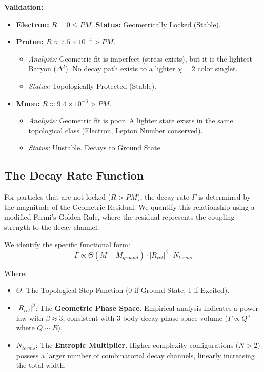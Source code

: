 \textbf{Validation:}
\begin{itemize}
    \item \textbf{Electron:} $R=0 \le PM$. \textbf{Status:} Geometrically Locked (Stable).
    \item \textbf{Proton:} $R \approx 7.5 \times 10^{-4} > PM$.
    \begin{itemize}
        \item \textit{Analysis:} Geometric fit is imperfect (stress exists), but it is the lightest Baryon ($\Delta^2$). No decay path exists to a lighter $\chi=2$ color singlet.
        \item \textit{Status:} Topologically Protected (Stable).
    \end{itemize}
    \item \textbf{Muon:} $R \approx 9.4 \times 10^{-3} > PM$.
    \begin{itemize}
        \item \textit{Analysis:} Geometric fit is poor. A lighter state exists in the same topological class (Electron, Lepton Number conserved).
        \item \textit{Status:} Unstable. Decays to Ground State.
    \end{itemize}
\end{itemize}

\subsection*{The Decay Rate Function}

For particles that are not locked ($R > PM$), the decay rate $\Gamma$ is determined by the magnitude of the Geometric Residual. We quantify this relationship using a modified Fermi's Golden Rule, where the residual represents the coupling strength to the decay channel.

We identify the specific functional form:
\[ \Gamma \propto \Theta(M - M_{ground}) \cdot |R_{rel}|^\beta \cdot N_{terms} \]

Where:
\begin{itemize}
    \item $\Theta$: The Topological Step Function (0 if Ground State, 1 if Excited).
    \item $|R_{rel}|^\beta$: The \textbf{Geometric Phase Space}. Empirical analysis indicates a power law with \textbf{$\beta \approx 3$}, consistent with 3-body decay phase space volume ($\Gamma \propto Q^5$ where $Q \sim R$).
    \item $N_{terms}$: The \textbf{Entropic Multiplier}. Higher complexity configurations ($N > 2$) possess a larger number of combinatorial decay channels, linearly increasing the total width.
\end{itemize}

